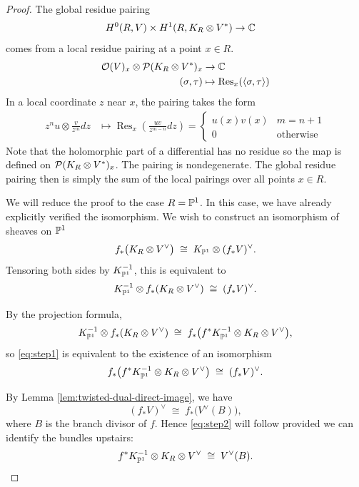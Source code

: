 \documentclass[12pt]{article}
\begin{document}
\begin{proof}
    The global residue pairing \begin{align*}
        H^0(R, V) \times H^1(R, K_R \otimes V^*) & \to \C 
    \end{align*} comes from a local residue pairing at a point $x\in R$. \begin{align*}
        \cO(V)_x \otimes \cP(K_R \otimes V^*)_x & \to \C \\
        (\sigma, \tau) & \mapsto \operatorname{Res}_x(\langle \sigma, \tau \rangle)
    \end{align*} In a local coordinate $z$ near $x$, the pairing takes the form \begin{align*}
        z^n u \otimes \frac{v}{z^m} dz & \mapsto \operatorname{Res}_x \left( \frac{u v}{z^{m-n}} dz \right) = \begin{cases}
            u(x)v(x) & m = n+1 \\
            0 & \text{otherwise}
        \end{cases}
    \end{align*}
    Note that the holomorphic part of a differential has no residue so the map is defined on $\cP(K_R \otimes V^*)_x$. The pairing is nondegenerate. The global residue pairing then is simply the sum of the local pairings over all points $x \in R$.

    We will reduce the proof to the case $R = \P^1$. In this case, we have already explicitly verified the isomorphism. We wish to construct an isomorphism of sheaves on $\P^1$
\begin{equation}\label{eq:target-duality}
  f_*\bigl(K_R\otimes V^\vee\bigr)
  \;\cong\;
  K_{\P^1}\otimes (f_*V)^\vee.
\end{equation}
Tensoring both sides by $K_{\P^1}^{-1}$, this is equivalent to
\begin{equation}\label{eq:step1}
  K_{\P^1}^{-1}\otimes f_*(K_R\otimes V^\vee)
  \;\cong\;
  (f_*V)^\vee.
\end{equation}

By the projection formula,
\[
K_{\P^1}^{-1}\otimes f_*(K_R\otimes V^\vee)
\;\cong\;
f_*\bigl(f^*K_{\P^1}^{-1}\otimes K_R\otimes V^\vee\bigr),
\]
so \eqref{eq:step1} is equivalent to the existence of an isomorphism
\begin{equation}\label{eq:step2}
  f_*\bigl(f^*K_{\P^1}^{-1}\otimes K_R\otimes V^\vee\bigr)
  \;\cong\;
  (f_*V)^\vee.
\end{equation}

By Lemma \ref{lem:twisted-dual-direct-image}, we have
\[
(f_*V)^\vee \;\cong\; f_*\bigl(V^\vee(B)\bigr),
\]
where $B$ is the branch divisor of $f$.  
Hence \eqref{eq:step2} will follow provided we can identify the bundles upstairs:
\begin{equation}\label{eq:step3}
  f^*K_{\P^1}^{-1}\otimes K_R\otimes V^\vee
  \;\cong\;
  V^\vee(B).
\end{equation}


\end{proof}
\end{document}
